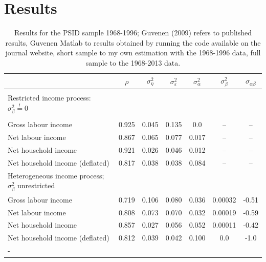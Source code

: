 \section{Results}
\begin{table}%
\begin{tabular}{l|cccccc}
                     &$\rho$ & $\sigma^2_{\eta}$&$\sigma^2_{\varepsilon}$&$\sigma^2_{\alpha}$&$\sigma^2_{\beta}$&$\sigma_{\alpha \beta}$\\
\hline
\hline \\
Restricted income process: $\sigma^2_{\beta} \stackrel{!}{=} 0$ \\
\hline \\
Gross labour income   & 0.925 &  0.045           &   0.135                &       0.0         &        --        &        --             \\
Net labour income     & 0.867 &  0.065           &   0.077                &       0.017       &        --        &        --             \\
Net household income  & 0.921 &  0.026           &   0.046                &       0.012       &        --        &        --             \\
Net household income (deflated) & 0.817 &  0.038 &   0.038                &       0.084       &        --        &        --             \\
\hline
Heterogeneous income process; $\sigma^2_{\beta}$ unrestricted \\
\hline
Gross labour income   & 0.719 &  0.106           &   0.080                &       0.036       &     0.00032      &       -0.51           \\
Net labour income     & 0.808 &  0.073           &   0.070                &       0.032       &     0.00019      &       -0.59           \\
Net household income  & 0.857 &  0.027           &   0.056                &       0.052       &     0.00011      &       -0.42           \\
Net household income (deflated) & 0.812 &  0.039 &   0.042                &       0.100       &        0.0       &       -1.0            \\
\hline-
\end{tabular}
\caption{Results for the PSID sample 1968-1996; Guvenen (2009) refers to published results, Guvenen Matlab to results obtained by running
the code available on the journal website, short sample to my own estimation with the 1968-1996 data, full sample to the 1968-2013 data.}
\label{PSID_results}
\end{table}

